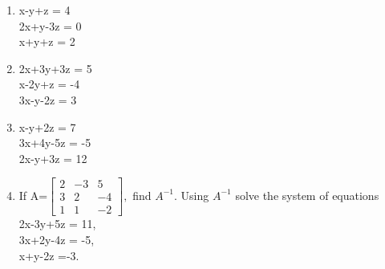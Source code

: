 \documentclass[journal,12pt,twocolumn]{IEEEtran}
\renewcommand\thesection{\arabic{section}}
\begin{document}
\begin{enumerate}[label=\thesection.\arabic*.,ref=\thesection.\theenumi]
\item x-y+z = 4 \\ 2x+y-3z = 0 \\ x+y+z = 2\\
\item 2x+3y+3z = 5 \\ x-2y+z = -4 \\ 3x-y-2z = 3\\
\item x-y+2z = 7 \\ 3x+4y-5z = -5 \\ 2x-y+3z = 12\\ 
\item If A=$\begin{bmatrix}
2&-3&5 \\ 3&2&-4 \\ 1&1&-2
\end{bmatrix},$ find $A^{-1}.$ Using $A^{-1}$ solve the system of equations \\
2x-3y+5z = 11, \\ 3x+2y-4z = -5, \\ x+y-2z =-3.\\
\end{enumerate}
\end{document}
